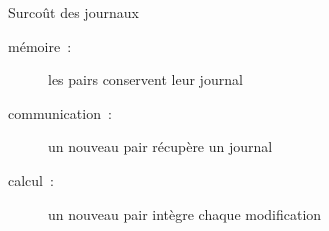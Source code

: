 \begin{frame}{Surcoût des journaux}
\begin{minipage}[c][.6\textheight][t]{\textwidth}
    \end{minipage}
    \begin{minipage}{\textwidth}
        \begin{description}
            \item[mémoire~:] les pairs conservent leur journal
            \item[communication~:] un nouveau pair récupère un journal
            \item[calcul~:] un nouveau pair intègre chaque modification
        \end{description}
    \end{minipage}
\end{frame}



